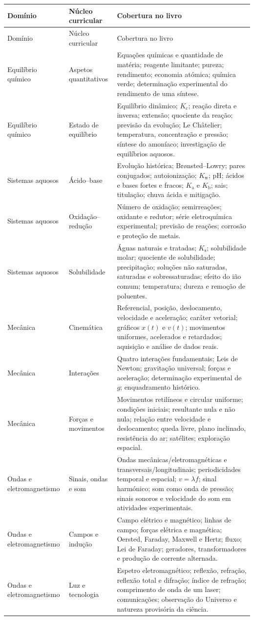 \documentclass[11pt,a4paper,oneside]{book}
\newcommand{\Kc}{K_{\mathrm c}}
\newcommand{\Ksp}{K_{\mathrm s}}
\newcommand{\Kw}{K_{\mathrm w}}
\newcommand{\Ka}{K_{\mathrm a}}
\newcommand{\Kb}{K_{\mathrm b}}
\begin{document}
\small
\begin{longtable}{p{}p{}p{}}
\toprule
Domínio & Núcleo curricular & Cobertura no livro \\
\midrule
\endfirsthead
\toprule
Domínio & Núcleo curricular & Cobertura no livro \\
\midrule
\endhead
Equilíbrio químico & Aspetos quantitativos & Equações químicas e quantidade de matéria; reagente limitante; pureza; rendimento; economia atómica; química verde; determinação experimental do rendimento de uma síntese. \\
Equilíbrio químico & Estado de equilíbrio & Equilíbrio dinâmico; $\Kc$; reação direta e inversa; extensão; quociente da reação; previsão da evolução; Le Châtelier; temperatura, concentração e pressão; síntese do amoníaco; investigação de equilíbrios aquosos. \\
Sistemas aquosos & Ácido--base & Evolução histórica; Brønsted--Lowry; pares conjugados; autoionização; $\Kw$; pH; ácidos e bases fortes e fracos; $\Ka$ e $\Kb$; sais; titulação; chuva ácida e mitigação. \\
Sistemas aquosos & Oxidação--redução & Número de oxidação; semirreações; oxidante e redutor; série eletroquímica experimental; previsão de reações; corrosão e proteção de metais. \\
Sistemas aquosos & Solubilidade & Águas naturais e tratadas; $\Ksp$; solubilidade molar; quociente de solubilidade; precipitação; soluções não saturadas, saturadas e sobressaturadas; efeito do ião comum; temperatura; dureza e remoção de poluentes. \\
Mecânica & Cinemática & Referencial, posição, deslocamento, velocidade e aceleração; caráter vetorial; gráficos $x(t)$ e $v(t)$; movimentos uniformes, acelerados e retardados; aquisição e análise de dados reais. \\
Mecânica & Interações & Quatro interações fundamentais; Leis de Newton; gravitação universal; forças e aceleração; determinação experimental de $g$; enquadramento histórico. \\
Mecânica & Forças e movimentos & Movimentos retilíneos e circular uniforme; condições iniciais; resultante nula e não nula; relação entre velocidade e deslocamento; queda livre, plano inclinado, resistência do ar; satélites; exploração espacial. \\
Ondas e eletromagnetismo & Sinais, ondas e som & Ondas mecânicas/eletromagnéticas e transversais/longitudinais; periodicidades temporal e espacial; $v=\lambda f$; sinal harmónico; som como onda de pressão; sinais sonoros e velocidade do som em atividades experimentais. \\
Ondas e eletromagnetismo & Campos e indução & Campo elétrico e magnético; linhas de campo; forças elétrica e magnética; Oersted, Faraday, Maxwell e Hertz; fluxo; Lei de Faraday; geradores, transformadores e produção de corrente alternada. \\
Ondas e eletromagnetismo & Luz e tecnologia & Espetro eletromagnético; reflexão, refração, reflexão total e difração; índice de refração; comprimento de onda de um laser; comunicações; observação do Universo e natureza provisória da ciência. \\
\bottomrule
\end{longtable}
\end{document}
